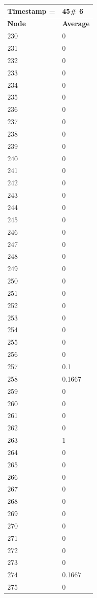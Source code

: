 \begin{tabular}{|l||l|}
\hline
\textbf{Timestamp =} & \textbf{45}\# 6\\\hline
	\textbf{Node} & \textbf{Average} \\ \hline
\hline
	230 & 0 \\ \hline
	231 & 0 \\ \hline
	232 & 0 \\ \hline
	233 & 0 \\ \hline
	234 & 0 \\ \hline
	235 & 0 \\ \hline
	236 & 0 \\ \hline
	237 & 0 \\ \hline
	238 & 0 \\ \hline
	239 & 0 \\ \hline
	240 & 0 \\ \hline
	241 & 0 \\ \hline
	242 & 0 \\ \hline
	243 & 0 \\ \hline
	244 & 0 \\ \hline
	245 & 0 \\ \hline
	246 & 0 \\ \hline
	247 & 0 \\ \hline
	248 & 0 \\ \hline
	249 & 0 \\ \hline
	250 & 0 \\ \hline
	251 & 0 \\ \hline
	252 & 0 \\ \hline
	253 & 0 \\ \hline
	254 & 0 \\ \hline
	255 & 0 \\ \hline
	256 & 0 \\ \hline
	257 & 0.1 \\ \hline
	258 & 0.1667 \\ \hline
	259 & 0 \\ \hline
	260 & 0 \\ \hline
	261 & 0 \\ \hline
	262 & 0 \\ \hline
	263 & 1 \\ \hline
	264 & 0 \\ \hline
	265 & 0 \\ \hline
	266 & 0 \\ \hline
	267 & 0 \\ \hline
	268 & 0 \\ \hline
	269 & 0 \\ \hline
	270 & 0 \\ \hline
	271 & 0 \\ \hline
	272 & 0 \\ \hline
	273 & 0 \\ \hline
	274 & 0.1667 \\ \hline
	275 & 0 \\ \hline
\end{tabular}

